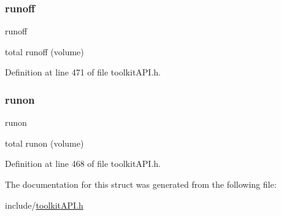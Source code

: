 \mbox{\label{struct_s_m___subcatch_stats_a4dcd362194c38698fe8f5b2659ba2dc6}} 
\subsubsection{\texorpdfstring{runoff}{runoff}}
{\footnotesize\ttfamily runoff}

total runoff (volume) 

Definition at line 471 of file toolkit\+A\+P\+I.\+h.

\mbox{\label{struct_s_m___subcatch_stats_ac05f157303936535978c7e69f6dfb16f}} 
\subsubsection{\texorpdfstring{runon}{runon}}
{\footnotesize\ttfamily runon}

total runon (volume) 

Definition at line 468 of file toolkit\+A\+P\+I.\+h.



The documentation for this struct was generated from the following file\+:\begin{DoxyCompactItemize}
\item 
include/\mbox{\hyperlink{toolkit_a_p_i_8h}{toolkit\+A\+P\+I.\+h}}\end{DoxyCompactItemize}

